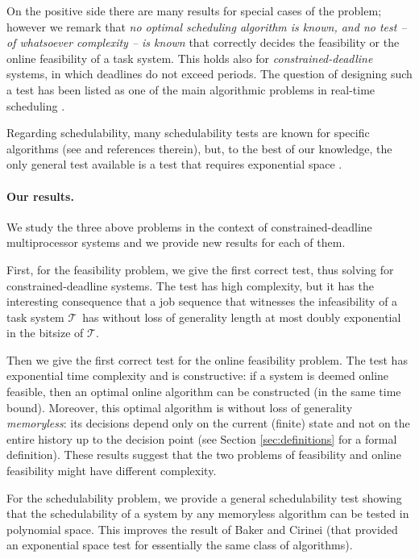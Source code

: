 \documentclass{llncs}
\newcommand{\tsys}{\ensuremath{\mathcal{T}}}
\begin{document}
On the positive side there are many results for special cases of the problem; however we remark that \emph{no optimal scheduling algorithm is known, and no test -- of whatsoever complexity -- is known} that correctly decides the feasibility or the online feasibility of a task system. This holds also for \emph{constrained-deadline} systems, in which deadlines do not exceed periods. The question of designing such a test has been listed as one of the main algorithmic problems in real-time scheduling \cite{Baruah:2009:open}.



Regarding schedulability, many schedulability tests are known for specific algorithms (see \cite{Baker:2007} and references therein), but, to the best of our knowledge, the only general test available is a test that requires exponential space  \cite{Baker:2007:b}.  





\paragraph{Our results.}
We study the three above problems in the context of constrained-deadline multiprocessor systems and we provide new  results for each of them.

First, for the feasibility problem, we give the first correct test, thus solving \cite[Open Problem 3]{Baruah:2009:open} for constrained-deadline systems. The test has high complexity, but it has the interesting consequence that a job sequence that witnesses the infeasibility of a task system \tsys\ has without loss of generality length at most doubly exponential in the bitsize of \tsys. 

Then we give the first correct test for the online feasibility problem. The test has exponential time complexity and is constructive: if a system is deemed online feasible, then an optimal online algorithm can be constructed (in the same time bound). Moreover, this optimal algorithm is without loss of generality \emph{memoryless}: its decisions depend only on the current (finite) state and not on the entire history up to the decision point (see Section \ref{sec:definitions} for a formal definition). These results suggest that the two problems of feasibility and online feasibility might have different complexity.

For the schedulability problem, we provide a general schedulability test showing that the schedulability of a system by any memoryless algorithm can be tested in polynomial space. This improves the result of Baker and Cirinei \cite{Baker:2007:b} (that provided an exponential space test for essentially the same class of algorithms).
\end{document}
